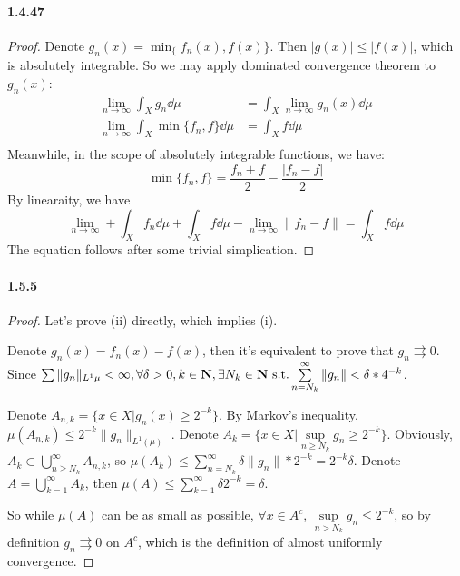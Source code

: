 \documentclass{article}
\begin{document}
\paragraph{1.4.47}
\begin{proof}
Denote $g_n(x)=\min_\{f_n(x),f(x)\}$. Then $|g(x)|\leq |f(x)|$, which is absolutely integrable. So we may apply dominated convergence theorem to $g_n(x)$:
\[\begin{aligned}
\lim_{n\to\infty}\int_{X}g_n\dd\mu&=\int_{X}\lim_{n\to\infty}g_n(x)\dd\mu\\
\lim_{n\to\infty}\int_{X}\min\{f_n,f\}\dd\mu&=\int_{X}f\dd\mu\\
\end{aligned}\]
Meanwhile, in the scope of absolutely integrable functions, we have:
\[\min\{f_n,f\}=\frac{f_n+f}{2}-\frac{|f_n-f|}{2}\]
By linearaity, we have
\[\lim_{n\to\infty}+\int_{X}f_n\dd\mu+\int_{X}f\dd\mu-\lim_{n\to\infty}\|f_n-f\|=\int_{X}f\dd\mu\]
The equation follows after some trivial simplication.
\end{proof}

\newcommand{\unito}{\rightrightarrows}

\paragraph{1.5.5}
\begin{proof}
Let's prove (ii) directly, which implies (i).

Denote $g_n(x)=f_n(x)-f(x)$, then it's equivalent to prove that $g_n\unito 0$. Since $\sum\limits \|g_n\|_{L^1{\mu}}<\infty, \forall \delta>0,k\in\mathbf{N},\exists N_k\in\mathbf{N}\text{ s.t.} \sum\limits_{n=N_k}^{\infty}\|g_n\|<\delta*4^{-k}$. 

Denote $A_{n,k}=\{x\in X|g_n(x)\geq 2^{-k}\}$. By Markov's inequality, $\mu(A_{n,k})\leq 2^{-k}\|g_n\|_{L^1(\mu)}$ . Denote $A_k=\{x\in X|\sup\limits_{n\geq N_k}g_n\geq 2^{-k}\}$. Obviously, $A_k\subset\bigcup\limits_{n\geq N_k}^{\infty}A_{n,k}$, so $\mu(A_k)\leq \sum_{n=N_k}^{\infty}\delta \|g_n\|*2^{-k}=2^{-k}\delta$. Denote $A=\bigcup_{k=1}^{\infty}A_k$, then $\mu(A)\leq\sum_{k=1}^{\infty}\delta2^{-k}=\delta$. 

So while $\mu(A)$ can be as small as possible, $\forall x\in A^c$, $\sup\limits_{n>N_k}g_n\leq 2^{-k}$, so by definition $g_n\unito 0$ on $A^c$, which is the definition of almost uniformly convergence. 
\end{proof}
\end{document}
